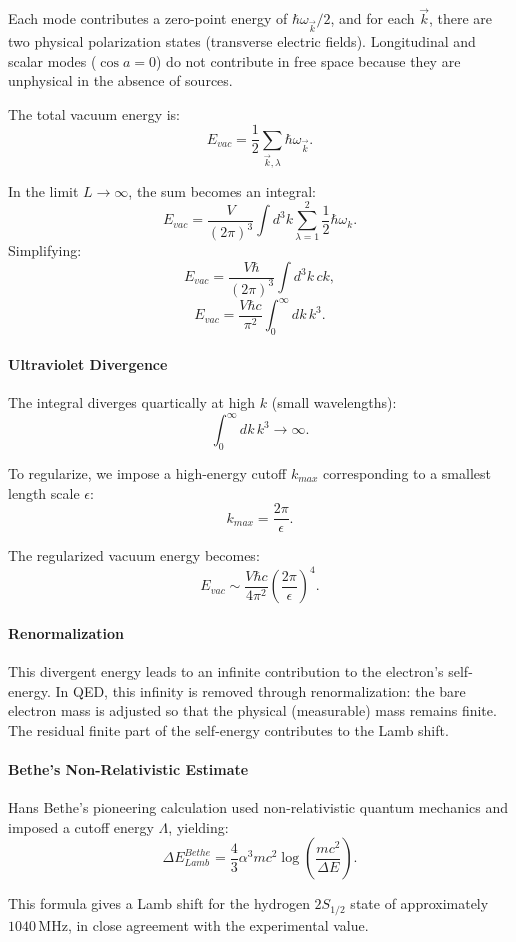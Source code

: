\documentclass[12pt]{article}
\begin{document}
Each mode contributes a zero-point energy of \(\hbar\omega_{\vec{k}}/2\), and for each \(\vec{k}\), there are two physical polarization states (transverse electric fields). Longitudinal and scalar modes (\(\cos a=0\)) do not contribute in free space because they are unphysical in the absence of sources.

The total vacuum energy is:
\[
E_{vac} = \frac{1}{2}\sum_{\vec{k},\lambda}\hbar\omega_{\vec{k}}.
\]

In the limit \(L \to \infty\), the sum becomes an integral:
\[
E_{vac} = \frac{V}{(2\pi)^3}\int d^3k \sum_{\lambda=1}^2 \frac{1}{2}\hbar\omega_k.
\]
Simplifying:
\[
E_{vac} = \frac{V\hbar}{(2\pi)^3}\int d^3k\,c k,
\]
\[
E_{vac} = \frac{V\hbar c}{\pi^2}\int_0^\infty dk\,k^3.
\]

\paragraph{Ultraviolet Divergence}
The integral diverges quartically at high \(k\) (small wavelengths):
\[
\int_0^\infty dk\,k^3 \to \infty.
\]

To regularize, we impose a high-energy cutoff \(k_{max}\) corresponding to a smallest length scale \(\epsilon\):
\[
k_{max} = \frac{2\pi}{\epsilon}.
\]

The regularized vacuum energy becomes:
\[
E_{vac} \sim \frac{V\hbar c}{4\pi^2}\left(\frac{2\pi}{\epsilon}\right)^4.
\]

\paragraph{Renormalization}
This divergent energy leads to an infinite contribution to the electron’s self-energy. In QED, this infinity is removed through renormalization: the bare electron mass is adjusted so that the physical (measurable) mass remains finite. The residual finite part of the self-energy contributes to the Lamb shift.

\paragraph{Bethe’s Non-Relativistic Estimate}
Hans Bethe’s pioneering calculation used non-relativistic quantum mechanics and imposed a cutoff energy \(\Lambda\), yielding:
\[
\Delta E_{Lamb}^{Bethe} = \frac{4}{3}\alpha^3 mc^2 \log\left(\frac{mc^2}{\Delta E}\right).
\]

This formula gives a Lamb shift for the hydrogen \(2S_{1/2}\) state of approximately \(1040\,\mathrm{MHz}\), in close agreement with the experimental value.
\end{document}
